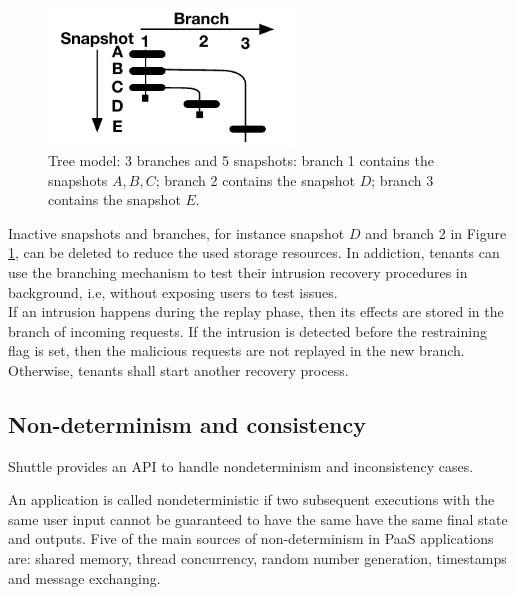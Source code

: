 \begin{figure}
\centering
\includegraphics[width=65mm]{images/branches}
\caption[Tree model]{Tree model: 3 branches and 5 snapshots: branch 1 contains the snapshots $A, B, C$; branch 2 contains the snapshot $D$;  branch 3 contains the snapshot $E$.}
\label{fig:branches}
\end{figure}



Inactive snapshots and branches, for instance snapshot $D$ and branch 2 in Figure \ref{fig:branches}, can be deleted to reduce the used storage resources. In addiction, tenants can use the branching mechanism to test their intrusion recovery procedures in background, i.e, without exposing users to test issues.\\

If an intrusion happens during the replay phase, then its effects are stored in the branch of incoming requests. If the intrusion is detected before the restraining flag is set, then the malicious requests are not replayed in the new branch. Otherwise, tenants shall start another recovery process.\\





\subsection{Non-determinism and consistency}
\label{sec:arch:consistency}

Shuttle provides an \ac{API} to handle nondeterminism and inconsistency cases.

An application is called nondeterministic if two subsequent executions with the same user input cannot be guaranteed to have the same have the same final state and outputs. Five of the main sources of non-determinism in \ac{PaaS} applications are: shared memory, thread concurrency, random number generation, timestamps and message exchanging.

